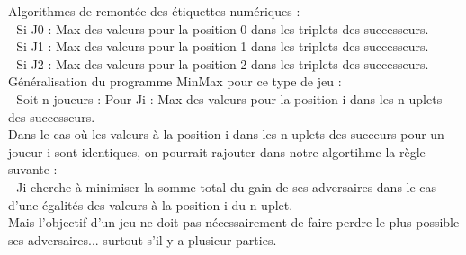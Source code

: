 \documentclass[12pt,a4paper, france]{article}
\newcommand\tab[1][1cm]{\hspace*{#1}}
\begin{document}
Algorithmes de remont\'ee des \'etiquettes num\'eriques : \\
\tab \tab - Si J0 : Max des valeurs pour la position 0 dans les triplets des successeurs.\\
\tab \tab - Si J1 : Max des valeurs pour la position 1 dans les triplets des successeurs.\\
\tab \tab - Si J2 : Max des valeurs pour la position 2 dans les triplets des successeurs.\\

G\'en\'eralisation du programme MinMax pour ce type de jeu : \\
- Soit n joueurs : Pour Ji : Max des valeurs pour la position i dans les n-uplets des successeurs.\\

Dans le cas o\`u les valeurs \`a la position i dans les n-uplets des succeurs pour un joueur i sont identiques, on pourrait rajouter dans notre algortihme la r\`egle suvante : \\
- Ji cherche \`a minimiser la somme total du gain de ses adversaires dans le cas d\textquoteright une \'egalit\'es des valeurs \`a la position i du n-uplet. \\

Mais l\textquoteright objectif d\textquoteright un jeu ne doit pas n\'ecessairement de faire perdre le plus possible ses adversaires... surtout s\textquoteright il y a plusieur parties.
\end{document}
